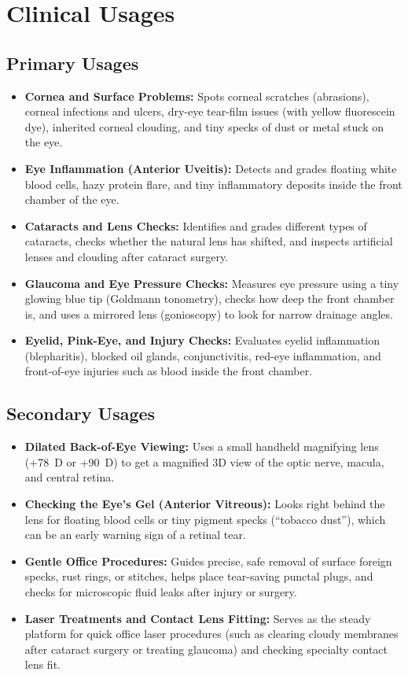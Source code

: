 \section{Clinical Usages}

\subsection{Primary Usages}

\begin{itemize}
    \item \textbf{Cornea and Surface Problems:} Spots corneal scratches (abrasions), corneal infections and ulcers, dry-eye tear-film issues (with yellow fluorescein dye), inherited corneal clouding, and tiny specks of dust or metal stuck on the eye.
    \item \textbf{Eye Inflammation (Anterior Uveitis):} Detects and grades floating white blood cells, hazy protein flare, and tiny inflammatory deposits inside the front chamber of the eye.
    \item \textbf{Cataracts and Lens Checks:} Identifies and grades different types of cataracts, checks whether the natural lens has shifted, and inspects artificial lenses and clouding after cataract surgery.
    \item \textbf{Glaucoma and Eye Pressure Checks:} Measures eye pressure using a tiny glowing blue tip (Goldmann tonometry), checks how deep the front chamber is, and uses a mirrored lens (gonioscopy) to look for narrow drainage angles.
    \item \textbf{Eyelid, Pink-Eye, and Injury Checks:} Evaluates eyelid inflammation (blepharitis), blocked oil glands, conjunctivitis, red-eye inflammation, and front-of-eye injuries such as blood inside the front chamber.
\end{itemize}

\subsection{Secondary Usages}

\begin{itemize}
    \item \textbf{Dilated Back-of-Eye Viewing:} Uses a small handheld magnifying lens (+78~D or +90~D) to get a magnified 3D view of the optic nerve, macula, and central retina.
    \item \textbf{Checking the Eye's Gel (Anterior Vitreous):} Looks right behind the lens for floating blood cells or tiny pigment specks (``tobacco dust''), which can be an early warning sign of a retinal tear.
    \item \textbf{Gentle Office Procedures:} Guides precise, safe removal of surface foreign specks, rust rings, or stitches, helps place tear-saving punctal plugs, and checks for microscopic fluid leaks after injury or surgery.
    \item \textbf{Laser Treatments and Contact Lens Fitting:} Serves as the steady platform for quick office laser procedures (such as clearing cloudy membranes after cataract surgery or treating glaucoma) and checking specialty contact lens fit.
\end{itemize}


